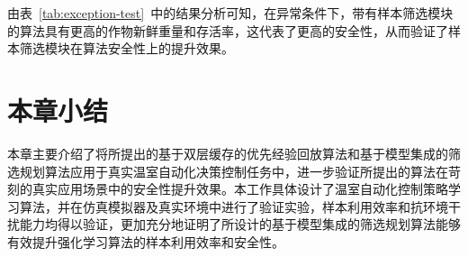 由表~\ref{tab:exception-test}~中的结果分析可知，在异常条件下，带有样本筛选模块的算法具有更高的作物新鲜重量和存活率，这代表了更高的安全性，从而验证了样本筛选模块在算法安全性上的提升效果。

\section{本章小结}

本章主要介绍了将所提出的基于双层缓存的优先经验回放算法和基于模型集成的筛选规划算法应用于真实温室自动化决策控制任务中，进一步验证所提出的算法在苛刻的真实应用场景中的安全性提升效果。本工作具体设计了温室自动化控制策略学习算法，并在仿真模拟器及真实环境中进行了验证实验，样本利用效率和抗环境干扰能力均得以验证，更加充分地证明了所设计的基于模型集成的筛选规划算法能够有效提升强化学习算法的样本利用效率和安全性。